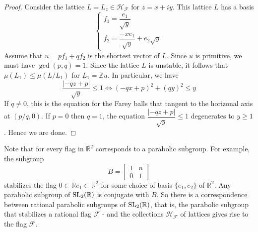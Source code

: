 \begin{proof}
  Consider the lattice $L=L_z \in \mathcal{H}_\mathcal{F}$ for $z = x+iy$. This lattice $L$ has a basis
  \[\begin{cases}
      f_1 = \dfrac{e_1}{\sqrt{y}} \\
      f_2 = \dfrac{-xe_1}{\sqrt{y}}+e_2\sqrt{y}
    \end{cases}\]
  Assume that $u=pf_1+qf_2$ is the shortest vector of $L$. Since $u$ is primitive, we must have $\gcd(p,q)=1$. Since the lattice
  $L$ is unstable, it follows that $\mu(L_1) \le \mu(L/L_1)$ for $L_1 = \mathbb{Z}u$. In particular, we have
  \[\dfrac{|-qz+p|}{\sqrt{y}} \le 1 \Leftrightarrow (-qx+p)^2 +(qy)^2 \le y \]
  If $q \ne 0$, this is the equation for the Farey balls that tangent to the horizonal axis at $(p/q,0)$. If $p=0$ then $q=1$, the equation
  $\dfrac{|-qz+p|}{\sqrt{y}} \le 1$ degenerates to $y \ge 1$. Hence we are done.
\end{proof}
\begin{remark}
  Note that for every flag in $\mathbb{R}^2$ corresponds to a parabolic subgroup. For example, the subgroup 
  \[B = \begin{bmatrix}
    1 & n \\
    0 & 1
  \end{bmatrix}\]
  stabilizes the flag $0 \subset \mathbb{R}e_1 \subset \mathbb{R}^2$ for some choice of basis $\{e_1,e_2\}$ of $\mathbb{R}^2$. Any parabolic subgroup of $\operatorname{SL_2(\mathbb{R})}$ is conjugate with $B$. So there is a correspondence between 
  rational parabolic subgroups of $\operatorname{SL_2(\mathbb{R})}$, that is, the parabolic subgroup that stabilizes a rational flag $\mathcal{F}$ - and the collections $\mathcal{H}_\mathcal{F}$ of lattices 
  gives rise to the flag $\mathcal{F}$. 
\end{remark}
